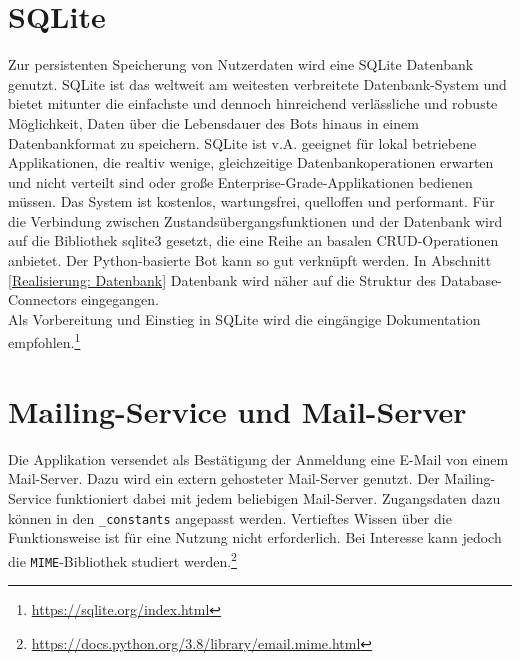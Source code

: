     \section{SQLite}
        Zur persistenten Speicherung von Nutzerdaten wird eine SQLite Datenbank \cite{sqlite} genutzt. SQLite ist das weltweit am weitesten verbreitete Datenbank-System und bietet mitunter die einfachste und dennoch hinreichend verlässliche und robuste Möglichkeit, Daten über die Lebensdauer des Bots hinaus in einem Datenbankformat zu speichern. SQLite ist v.A. geeignet für lokal betriebene Applikationen, die realtiv wenige, gleichzeitige Datenbankoperationen erwarten und nicht verteilt sind oder große Enterprise-Grade-Applikationen bedienen müssen. Das System ist kostenlos, wartungsfrei, quelloffen und performant. Für die Verbindung zwischen Zustandsübergangsfunktionen und der Datenbank wird auf die Bibliothek sqlite3 \cite{sqlite3API} gesetzt, die eine Reihe an basalen CRUD-Operationen anbietet. Der Python-basierte Bot kann so gut verknüpft werden. In Abschnitt \ref{Realisierung: Datenbank} Datenbank wird näher auf die Struktur des Database-Connectors eingegangen. \\
        Als Vorbereitung und Einstieg in SQLite wird die eingängige Dokumentation empfohlen.\footnote{\url{https://sqlite.org/index.html}}


    \section{Mailing-Service und Mail-Server}
        Die Applikation versendet als Bestätigung der Anmeldung eine E-Mail von einem Mail-Server. Dazu wird ein extern gehosteter Mail-Server genutzt. Der Mailing-Service funktioniert dabei mit jedem beliebigen Mail-Server. Zugangsdaten dazu können in den \verb|_constants| angepasst werden. Vertieftes Wissen über die Funktionsweise ist für eine Nutzung nicht erforderlich. Bei Interesse kann jedoch die \verb|MIME|-Bibliothek studiert werden.\footnote{\url{https://docs.python.org/3.8/library/email.mime.html}}


